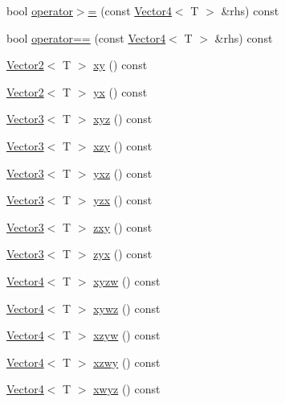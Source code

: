 \begin{DoxyCompactItemize}
bool \mbox{\hyperlink{class_vector4_a775421e83f0bdf6cf96e9cd936e7cb38}{operator$>$=}} (const \mbox{\hyperlink{class_vector4}{Vector4}}$<$ T $>$ \&rhs) const
\item 
bool \mbox{\hyperlink{class_vector4_ab25cd3a793ef8f07c92fae01a94e7967}{operator==}} (const \mbox{\hyperlink{class_vector4}{Vector4}}$<$ T $>$ \&rhs) const
\item 
\mbox{\hyperlink{class_vector2}{Vector2}}$<$ T $>$ \mbox{\hyperlink{class_vector4_aca433dfa3d0e963899d6a3916fda347a}{xy}} () const
\item 
\mbox{\hyperlink{class_vector2}{Vector2}}$<$ T $>$ \mbox{\hyperlink{class_vector4_a06f881777d4f9732865873fabf2a0205}{yx}} () const
\item 
\mbox{\hyperlink{class_vector3}{Vector3}}$<$ T $>$ \mbox{\hyperlink{class_vector4_a64bc2c65683c50be01c8646487d4d5b2}{xyz}} () const
\item 
\mbox{\hyperlink{class_vector3}{Vector3}}$<$ T $>$ \mbox{\hyperlink{class_vector4_a63e5ff911ce1b46e4e7d20bfbb332609}{xzy}} () const
\item 
\mbox{\hyperlink{class_vector3}{Vector3}}$<$ T $>$ \mbox{\hyperlink{class_vector4_ac19d943d99e2eacd49a3fcf69b831c3e}{yxz}} () const
\item 
\mbox{\hyperlink{class_vector3}{Vector3}}$<$ T $>$ \mbox{\hyperlink{class_vector4_a5a5b166bcd45c5585e433699cdff9341}{yzx}} () const
\item 
\mbox{\hyperlink{class_vector3}{Vector3}}$<$ T $>$ \mbox{\hyperlink{class_vector4_aab381bde8b0a45e3ba956b173abfefcd}{zxy}} () const
\item 
\mbox{\hyperlink{class_vector3}{Vector3}}$<$ T $>$ \mbox{\hyperlink{class_vector4_aba4508c629559b731b21d49e780b4d91}{zyx}} () const
\item 
\mbox{\hyperlink{class_vector4}{Vector4}}$<$ T $>$ \mbox{\hyperlink{class_vector4_a0d500980b978b94728d6eefe536aa4eb}{xyzw}} () const
\item 
\mbox{\hyperlink{class_vector4}{Vector4}}$<$ T $>$ \mbox{\hyperlink{class_vector4_ac919172fd134566a36b6ee1fb56ff2c3}{xywz}} () const
\item 
\mbox{\hyperlink{class_vector4}{Vector4}}$<$ T $>$ \mbox{\hyperlink{class_vector4_a706593d979b9a4265eeb4c9659dcfa27}{xzyw}} () const
\item 
\mbox{\hyperlink{class_vector4}{Vector4}}$<$ T $>$ \mbox{\hyperlink{class_vector4_a7c2c94c8c945e72f80891cd90a7efceb}{xzwy}} () const
\item 
\mbox{\hyperlink{class_vector4}{Vector4}}$<$ T $>$ \mbox{\hyperlink{class_vector4_aaa46ea3999294d8930b33003e7eb7d24}{xwyz}} () const

\end{DoxyCompactItemize}
